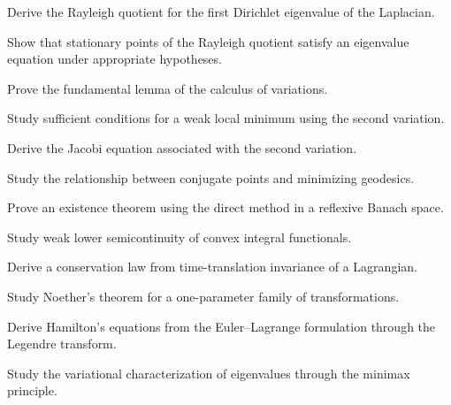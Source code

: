 \begin{exercise}[3]
Derive the Rayleigh quotient for the first Dirichlet eigenvalue of the
Laplacian.
\end{exercise}

\begin{exercise}[3]
Show that stationary points of the Rayleigh quotient satisfy an
eigenvalue equation under appropriate hypotheses.
\end{exercise}

\begin{exercise}[4]
Prove the fundamental lemma of the calculus of variations.
\end{exercise}

\begin{exercise}[4]
Study sufficient conditions for a weak local minimum using the second
variation.
\end{exercise}

\begin{exercise}[4]
Derive the Jacobi equation associated with the second variation.
\end{exercise}

\begin{exercise}[4]
Study the relationship between conjugate points and minimizing
geodesics.
\end{exercise}

\begin{exercise}[4]
Prove an existence theorem using the direct method in a reflexive Banach
space.
\end{exercise}

\begin{exercise}[4]
Study weak lower semicontinuity of convex integral functionals.
\end{exercise}

\begin{exercise}[4]
Derive a conservation law from time-translation invariance of a
Lagrangian.
\end{exercise}

\begin{exercise}[4]
Study Noether's theorem for a one-parameter family of transformations.
\end{exercise}

\begin{exercise}[4]
Derive Hamilton's equations from the Euler--Lagrange formulation through
the Legendre transform.
\end{exercise}

\begin{exercise}[4]
Study the variational characterization of eigenvalues through the
minimax principle.
\end{exercise}

